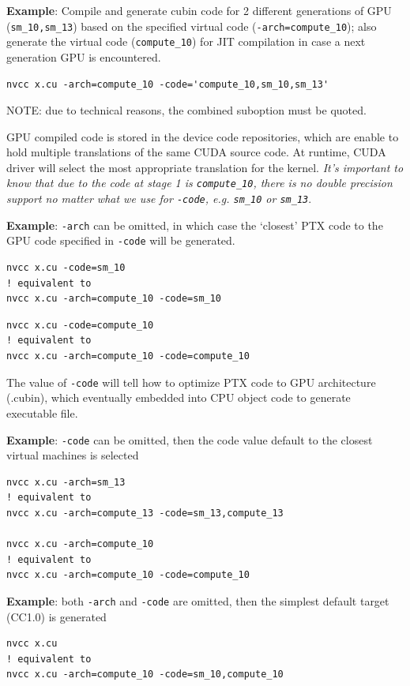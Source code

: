 {\bf Example}: Compile and generate cubin code for 2 different
generations of GPU (\verb!sm_10,sm_13!) based on the specified virtual code
(\verb!-arch=compute_10!); also generate the virtual code
(\verb!compute_10!) for JIT compilation in case a next
generation GPU is encountered.
\begin{verbatim}
nvcc x.cu -arch=compute_10 -code='compute_10,sm_10,sm_13'
\end{verbatim}
NOTE: due to technical reasons, the combined suboption must be quoted.

GPU compiled code is stored in the device code repositories, which are
enable to hold multiple translations of the same CUDA source code. At
runtime, CUDA driver will select the most appropriate translation for
the kernel.
{\it It's important to know that due to the code at stage 1 is
  \verb!compute_10!, there is no double precision support no matter
  what we use for \verb!-code!, e.g.  \verb!sm_10! or \verb!sm_13!}.

{\bf Example}: \verb!-arch! can be omitted, in which case the
`closest' PTX code to the GPU code specified in \verb!-code! will be
generated. 
\begin{verbatim}
nvcc x.cu -code=sm_10
! equivalent to
nvcc x.cu -arch=compute_10 -code=sm_10
\end{verbatim}

\begin{verbatim}
nvcc x.cu -code=compute_10
! equivalent to
nvcc x.cu -arch=compute_10 -code=compute_10
\end{verbatim}
The value of \verb!-code! will tell how to optimize PTX code to GPU
architecture (.cubin), which eventually embedded into CPU object code
to generate executable file.


{\bf Example}: \verb!-code! can be omitted, then the code value
default to the closest virtual machines is selected
\begin{verbatim}
nvcc x.cu -arch=sm_13
! equivalent to 
nvcc x.cu -arch=compute_13 -code=sm_13,compute_13

nvcc x.cu -arch=compute_10
! equivalent to
nvcc x.cu -arch=compute_10 -code=compute_10
\end{verbatim}

{\bf Example}: both \verb!-arch! and \verb!-code! are omitted, then
the simplest default target (CC1.0) is generated
\begin{verbatim}
nvcc x.cu
! equivalent to
nvcc x.cu -arch=compute_10 -code=sm_10,compute_10
\end{verbatim}









